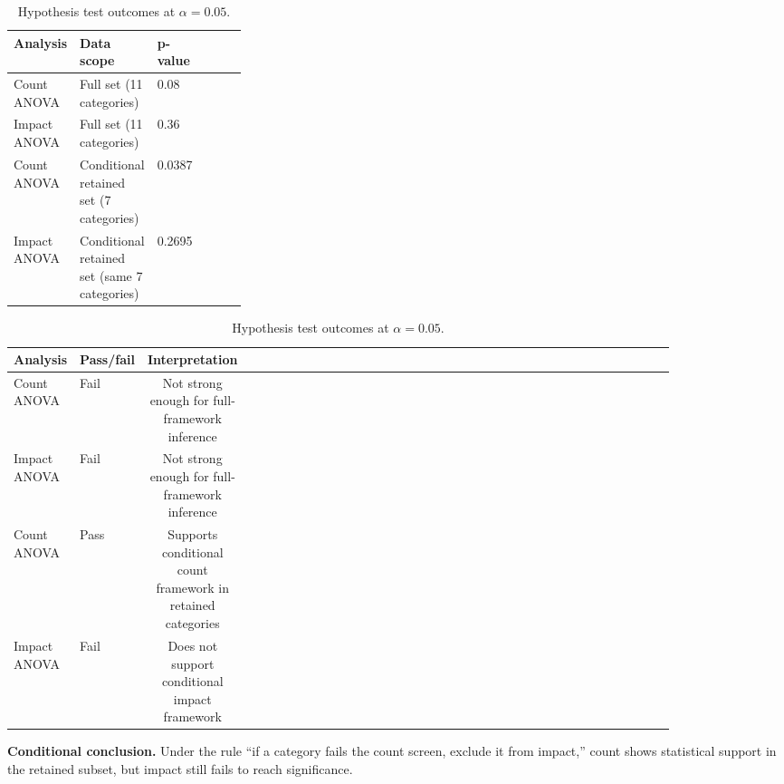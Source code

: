 \begin{table}[H]
  \centering
  \caption{Hypothesis test outcomes at $\alpha=0.05$.}
  \label{tab:conditional-pass-fail1}
  \small
  \begin{tabular}{@{}llp{0.15\linewidth}lp{0.15\linewidth}@{}}
    \toprule
    Analysis & Data scope & p-value\\
    \midrule
    Count ANOVA & Full set (11 categories) & 0.08 \\
    Impact ANOVA & Full set (11 categories) & 0.36 \\
    Count ANOVA & Conditional retained set (7 categories) & 0.0387 \\
    Impact ANOVA & Conditional retained set (same 7 categories) & 0.2695\\
    \bottomrule
  \end{tabular}
\end{table}
\begin{table}[H]
  \centering
  \caption{Hypothesis test outcomes at $\alpha=0.05$.}
  \label{tab:conditional-pass-fail2}
  \small
  \begin{tabular}{@{}lp{0.10\linewidth}cp{0.10\linewidth}cp{0.65\linewidth}@{}}
    \toprule
    Analysis &  Pass/fail & Interpretation\\
    \midrule
    Count ANOVA & Fail & Not strong enough for full-framework inference\\
    Impact ANOVA & Fail & Not strong enough for full-framework inference\\
    Count ANOVA & Pass & Supports conditional count framework in retained categories\\
    Impact ANOVA & Fail & Does not support conditional impact framework\\
    \bottomrule
  \end{tabular}
\end{table}

\noindent\textbf{Conditional conclusion.}
Under the rule ``if a category fails the count screen, exclude it from impact,'' count shows statistical support in the retained subset, but impact still fails to reach significance.

